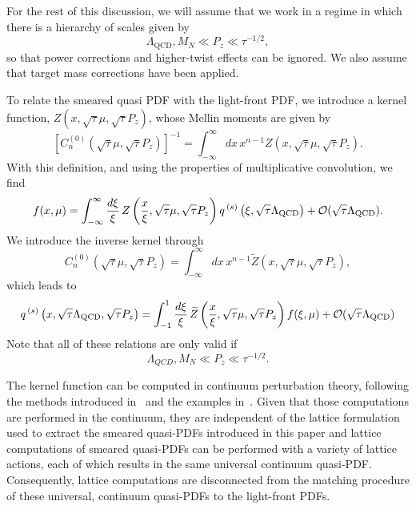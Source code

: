 For the rest of this discussion, we will assume that we work in a regime in 
which there is a hierarchy of scales given by
\begin{equation}\label{eq:scales}
\Lambda_{\mathrm{QCD}},M_N\ll P_z\ll  \tau^{-1/2},
\end{equation}
so that power corrections and higher-twist effects can be ignored. We also 
assume that target mass corrections have been applied.

To relate the smeared quasi PDF with the light-front 
PDF, we introduce a kernel function, $Z(x,\sqrt{\tau}\mu,\sqrt{\tau}P_z)$,
whose Mellin moments are given by
\begin{equation}\label{eq:cinvz}
 \left[C_n^{(0)}(\sqrt{\tau}\mu, \sqrt{\tau}P_z)\right]^{-1} = 
\int_{-\infty}^{\infty} dx\, x^{n-1}  
Z(x,\sqrt{\tau}\mu, \sqrt{\tau}P_z).
\end{equation}
With this definition, and using the properties of multiplicative convolution, 
we find 
\begin{equation}
f(x,\mu) =  \int_{-\infty}^{\infty} \frac{d\xi}{\xi}\, 
Z\left(\frac{x}{\xi},\sqrt{\tau}\mu, \sqrt{\tau}P_z\right) 
q^{\,(s)}\left(\xi,\sqrt{\tau} \Lambda_{\mathrm{QCD}}\right) + {\cal 
O}(\sqrt{\tau}\Lambda_{\mathrm{QCD}}).
\end{equation}
We introduce the inverse kernel through
\begin{equation}
C_n^{(0)}(\sqrt{\tau}\mu, \sqrt{\tau}P_z) = \int_{-\infty}^{\infty} dx\, 
x^{n-1}  
\widetilde{Z}(x,\sqrt{\tau}\mu, \sqrt{\tau}P_z),
\end{equation}
which leads to
\begin{equation}
q^{\,(s)}\left(x,\sqrt{\tau} \Lambda_{\mathrm{QCD}}, \sqrt{\tau}P_z\right) =  
\int_{-1}^{1} 
\frac{d\xi}{\xi}\, \widetilde{Z}\left(\frac{x}{\xi},\sqrt{\tau}\mu, 
\sqrt{\tau}P_z\right) 
f(\xi,\mu) + 
{\cal O}(\sqrt{\tau}\Lambda_{\mathrm{QCD}})
\end{equation}
Note that all of these relations are only 
valid if
\begin{equation}\label{eq:scales_tau}
\Lambda_{QCD},M_N\ll P_z \ll \tau^{-1/2}.
\end{equation}

The kernel function can be 
computed in continuum perturbation theory, following the methods introduced 
in~\cite{Luscher:2011bx} and the examples 
in~\cite{Ma:2014jla,Ji:2015jwa,Chen:2016fxx,Ishikawa:2016znu}.
Given that those computations are performed in the continuum, 
they are independent of the lattice formulation used to extract the 
smeared quasi-PDFs introduced in this paper and lattice computations of 
smeared quasi-PDFs can be performed with a variety of lattice actions, each of 
which results in the same universal continuum quasi-PDF. Consequently, lattice 
computations are disconnected from the matching procedure of these universal, 
continuum quasi-PDFs to the light-front PDFs.  

